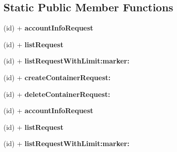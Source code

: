 \subsection*{\-Static \-Public \-Member \-Functions}
\begin{DoxyCompactItemize}
\item 
\hypertarget{interface_a_s_i_cloud_files_container_request_a9eb32f26e056aad2899ee68802814965}{
(id) + {\bfseries account\-Info\-Request}}
\label{interface_a_s_i_cloud_files_container_request_a9eb32f26e056aad2899ee68802814965}

\item 
\hypertarget{interface_a_s_i_cloud_files_container_request_a3cc3001fc75e024b6dbddb86d8e4ef1c}{
(id) + {\bfseries list\-Request}}
\label{interface_a_s_i_cloud_files_container_request_a3cc3001fc75e024b6dbddb86d8e4ef1c}

\item 
\hypertarget{interface_a_s_i_cloud_files_container_request_a95324e0dfb223b3da94f3f44d2694ce1}{
(id) + {\bfseries list\-Request\-With\-Limit\-:marker\-:}}
\label{interface_a_s_i_cloud_files_container_request_a95324e0dfb223b3da94f3f44d2694ce1}

\item 
\hypertarget{interface_a_s_i_cloud_files_container_request_a15c9e119fb4e2232510a0125b6d8307d}{
(id) + {\bfseries create\-Container\-Request\-:}}
\label{interface_a_s_i_cloud_files_container_request_a15c9e119fb4e2232510a0125b6d8307d}

\item 
\hypertarget{interface_a_s_i_cloud_files_container_request_a7507163cc7766f015fdfb8a7d0f4fc25}{
(id) + {\bfseries delete\-Container\-Request\-:}}
\label{interface_a_s_i_cloud_files_container_request_a7507163cc7766f015fdfb8a7d0f4fc25}

\item 
\hypertarget{interface_a_s_i_cloud_files_container_request_a9eb32f26e056aad2899ee68802814965}{
(id) + {\bfseries account\-Info\-Request}}
\label{interface_a_s_i_cloud_files_container_request_a9eb32f26e056aad2899ee68802814965}

\item 
\hypertarget{interface_a_s_i_cloud_files_container_request_a3cc3001fc75e024b6dbddb86d8e4ef1c}{
(id) + {\bfseries list\-Request}}
\label{interface_a_s_i_cloud_files_container_request_a3cc3001fc75e024b6dbddb86d8e4ef1c}

\item 
\hypertarget{interface_a_s_i_cloud_files_container_request_a95324e0dfb223b3da94f3f44d2694ce1}{
(id) + {\bfseries list\-Request\-With\-Limit\-:marker\-:}}
\label{interface_a_s_i_cloud_files_container_request_a95324e0dfb223b3da94f3f44d2694ce1}


\end{DoxyCompactItemize}
